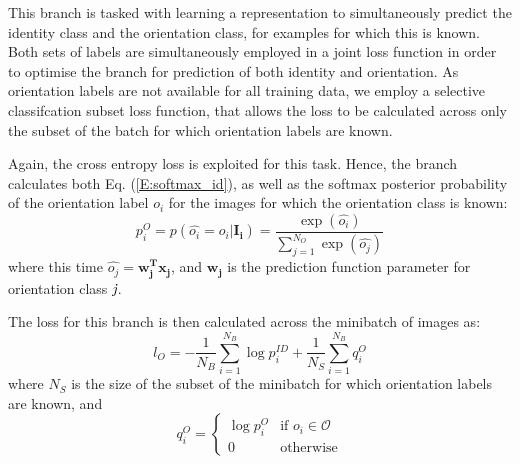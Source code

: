 \documentclass[10pt,twocolumn,letterpaper]{article}
\begin{document}
This branch is tasked with learning a representation to simultaneously predict the identity class and the orientation class, for examples for which this is known.
Both sets of labels are simultaneously employed in a joint loss function in order to optimise the branch for prediction of both identity and orientation. As orientation labels are not available for all training data, we employ a selective classifcation subset loss function, that allows the loss to be calculated across only the subset of the batch for which orientation labels are known.

Again, the cross entropy loss is exploited for this task. Hence, the branch calculates both Eq. (\ref{E:softmax_id}), as well as the softmax posterior probability of the orientation label $o_i$ for the images for which the orientation class is known:
\begin{equation}
  p_i^{O} = p(\hat{o_i} = o_i|\mathbf{I_i}) = \frac{\exp(\hat{o_i})}{\sum_{j=1}^{N_{O}}\exp(\hat{o_j})}
\end{equation}
where this time $\hat{o_j} = \mathbf{w_j^Tx_j}$, and $\mathbf{w_j}$ is the prediction function parameter for orientation class $\emph{j}$.

The loss for this branch is then calculated across the minibatch of images as:
\begin{equation}
  l_{O} = -\frac{1}{N_B} \sum_{i=1}^{N_B}\log{p_i^{ID}} + \frac{1}{N_S} \sum_{i=1}^{N_B}q_i^O
\end{equation}
where $N_S$ is the size of the subset of the minibatch for which orientation labels are known, and
\[
q_i^O =
\begin{cases}
    \log{p_i^{O}} & \text{if } o_i \in \mathcal{O} \\
    0 & \text{otherwise}
\end{cases}
\]

\end{document}
